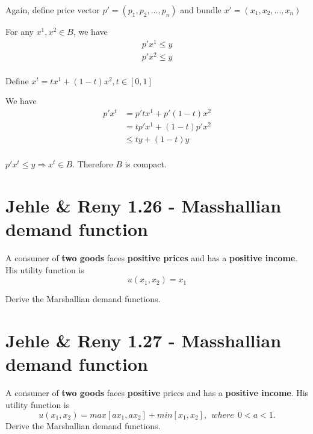 \documentclass{article}
\begin{document}
Again, define price vector $p' = (p_1, p_2, \ldots, p_n)$ and bundle ${x}' = (x_1, x_2, \ldots, x_n)$

For any $x^1, x^2 \in B$, we have 
\begin{align*}  
     p'x^1 \le y \\
     p'x^2 \le y \\
\end{align*}

Define $x^t = tx^1 + (1-t)x^2, t \in [0,1]$

We have 
\begin{align*}  
  p'x^t &=  p'tx^1 +  p'(1-t)x^2 \\
        &=  tp'x^1 +  (1-t)p'x^2 \\
        &\le  ty +  (1-t)y \\
    \nonumber     
\end{align*}

$p'x^t \le y \Rightarrow x^t \in B$. Therefore $B$ is compact.



\section{Jehle \& Reny 1.26 - Masshallian demand function}
A consumer of \textbf{two goods} faces \textbf{positive prices} and has a \textbf{positive income}. 
His utility function is $$u(x_1, x_2) = x_1$$ 

Derive the Marshallian demand functions.

\section{Jehle \& Reny 1.27 - Masshallian demand function}

A consumer of \textbf{two goods} faces \textbf{positive} prices and has a \textbf{positive income}. 
His utility function is $$u(x_1, x_2) = max[ax_1, ax_2] + min[x_1, x_2], \ \ where \ \ 0 < a < 1.$$
Derive the Marshallian demand functions.
\end{document}
